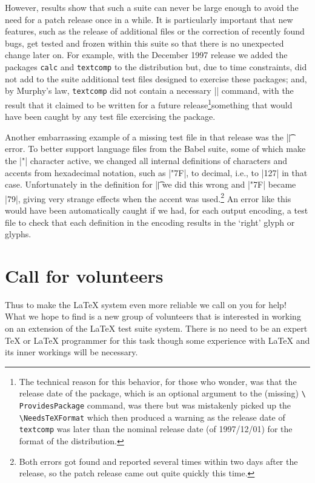\documentclass{ltugboat}
\begin{document}
However, results show that such a suite can never be large enough to
avoid the need for a patch release once in a while.  It is
particularly important that new
features, such as the release of additional files or the correction of
recently found bugs, get tested and frozen within this suite so that
there is no unexpected change later on.  For example, with the December
1997 release we added the packages \texttt{calc} and \texttt{textcomp}
to the distribution but, due to time constraints, did not add to the suite  
additional test files designed to exercise these packages; 
and, by Murphy's law, \texttt{textcomp} did not contain a necessary
|\ProvidesPackage| command, with the result that it claimed to be
written for a future release\footnote{The technical reason for this
  behavior, for those who wonder, was that the release date of the
  package, which is an optional argument to the (missing)
  \texttt{\textbackslash
    ProvidesPackage} command, was there but was mistakenly picked up the
  \texttt{\textbackslash NeedsTeXFormat} which then produced a warning
  as the release date of \texttt{textcomp} was later than the nominal
  release date (of 1997/12/01) for the format of the
  distribution.}\Dash something that would have been caught by any test
file exercising the package.

Another embarrassing example of a missing test file in that release
was the |\t| error.  To better support language files from the Babel
suite, some of which make the |"| character active, we changed all
internal definitions of characters and accents from 
hexadecimal notation, such as |"7F|, to decimal, i.e., to |127| in that case.
Unfortunately in the definition for |\t| we did this wrong and |"7F|
became |79|, giving very strange effects when the accent was
used.\footnote{Both errors got found and reported several times within
  two days after the release, so the patch release came out quite
  quickly this time.} An error like this would have been automatically
caught if we had, for each output encoding, a test file to
check that each definition in the encoding results in the `right' glyph or
glyphs.


\newpage

\section{Call for volunteers}

Thus to make the \LaTeX{} system even more reliable we call on you for
help! What we hope to find is a new group of volunteers that is
interested in working on an extension of the \LaTeX{} test suite
system. There is no need to be an expert \TeX{} or \LaTeX{} programmer
for this task though some experience with \LaTeX{} and its inner
workings will be necessary.
\end{document}
